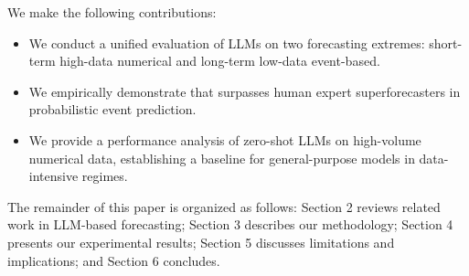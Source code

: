 We make the following contributions:
\begin{itemize}[leftmargin=*,itemsep=0pt,topsep=0pt]
    \item We conduct a unified evaluation of LLMs on two forecasting extremes: short-term high-data numerical and long-term low-data event-based.
    \item We empirically demonstrate that \methodname surpasses human expert superforecasters in probabilistic event prediction.
    \item We provide a performance analysis of zero-shot LLMs on high-volume numerical data, establishing a baseline for general-purpose models in data-intensive regimes.
\end{itemize}

The remainder of this paper is organized as follows: Section 2 reviews related work in LLM-based forecasting; Section 3 describes our methodology; Section 4 presents our experimental results; Section 5 discusses limitations and implications; and Section 6 concludes.
